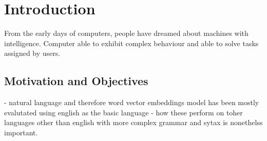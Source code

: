 \chapter{Introduction}
\label{chapter:Introduction}

From the early days of computers, people have dreamed about machines with intelligence. Computer able to exhibit complex behaviour and able to solve tasks assigned by users.



\section{Motivation and Objectives}
\label{sec:motivation}
- natural language and therefore word vector embeddings model has been mostly evalutated using english as the basic language
- how these perform on toher languages other than english with more complex grammar and sytax is nonethelss important.

